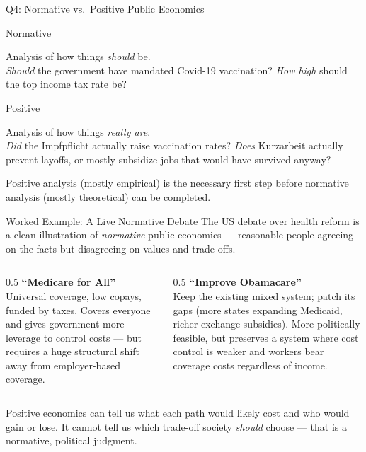 \documentclass[11pt,aspectratio=169]{beamer}
\begin{document}
\begin{frame}{Q4: Normative vs.\ Positive Public Economics}
  \begin{block}{Normative}

    Analysis of how things \emph{should} be. \\
    \emph{Should} the government have mandated Covid-19 vaccination? \emph{How high} should the top income tax rate be?
  \end{block}
  \begin{block}{Positive}

    Analysis of how things \emph{really are}. \\
    \emph{Did} the Impfpflicht actually raise vaccination rates? \emph{Does} Kurzarbeit actually prevent layoffs, or mostly subsidize jobs that would have survived anyway?
  \end{block}
  \vspace{0.5em}
  \centering
  \alert{Positive analysis (mostly empirical) is the necessary first step before normative analysis (mostly theoretical) can be completed.}
\end{frame}

\begin{frame}{Worked Example: A Live Normative Debate}
  The US debate over health reform is a clean illustration of \emph{normative} public economics --- reasonable people agreeing on the facts but disagreeing on values and trade-offs.
  \begin{columns}[T]
    \begin{column}{0.5\textwidth}
      \textbf{``Medicare for All''}\\
      \small Universal coverage, low copays, funded by taxes. Covers everyone and gives government more leverage to control costs --- but requires a huge structural shift away from employer-based coverage.
    \end{column}
    \begin{column}{0.5\textwidth}
      \textbf{``Improve Obamacare''}\\
      \small Keep the existing mixed system; patch its gaps (more states expanding Medicaid, richer exchange subsidies). More politically feasible, but preserves a system where cost control is weaker and workers bear coverage costs regardless of income.
    \end{column}
  \end{columns}
  \vspace{0.5em}
  \small Positive economics can tell us what each path would likely cost and who would gain or lose. It cannot tell us which trade-off society \emph{should} choose --- that is a normative, political judgment.
\end{frame}
\end{document}
